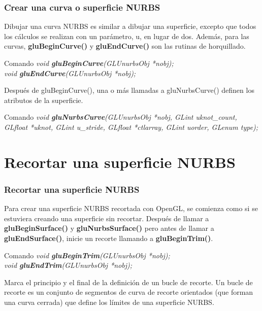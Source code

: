 \documentclass[10.5pt]{beamer}
\begin{document}
\begin{frame}[fragile]
\frametitle{Crear una curva o superficie NURBS}
\small
Dibujar una curva NURBS es similar a dibujar una superficie, excepto
que todos los cálculos se realizan con un parámetro, u, en lugar de dos.
Además, para las curvas, \textbf{gluBeginCurve()} y \textbf{gluEndCurve()} son las
rutinas de horquillado.

\begin{alertblock}{Comando}
    \small
    \emph{void \textbf{gluBeginCurve}(GLUnurbsObj *nobj);}\\
    \emph{void \textbf{gluEndCurve}(GLUnurbsObj *nobj);}
\end{alertblock}

Después de gluBeginCurve(), una o más llamadas a
gluNurbsCurve() definen los atributos de la superficie.

\begin{alertblock}{Comando}
    \small
    \emph{void \textbf{gluNurbsCurve}(GLUnurbsObj *nobj, GLint uknot\_count,
    GLfloat *uknot, GLint u\_stride, GLfloat *ctlarray,
    GLint uorder, GLenum type);}
\end{alertblock}

\end{frame}


\section{Recortar una superficie NURBS}
\begin{frame}[fragile]
\frametitle{Recortar una superficie NURBS}
\small
Para crear una superficie NURBS recortada con OpenGL, se comienza como
si se estuviera creando una superficie sin recortar.
Después de llamar a \textbf{gluBeginSurface()} y \textbf{gluNurbsSurface()}
pero antes de llamar a \textbf{gluEndSurface()}, inicie un recorte
llamando a \textbf{gluBeginTrim()}.

\begin{alertblock}{Comando}
    \small
    \emph{void \textbf{gluBeginTrim}(GLUnurbsObj *nobj);}\\
    \emph{void \textbf{gluEndTrim}(GLUnurbsObj *nobj);}
\end{alertblock}

Marca el principio y el final de la definición
de un bucle de recorte. Un bucle de recorte es un conjunto
de segmentos de curva de recorte orientados (que forman
una curva cerrada) que define los límites de una superficie NURBS.

\end{frame}
\end{document}
